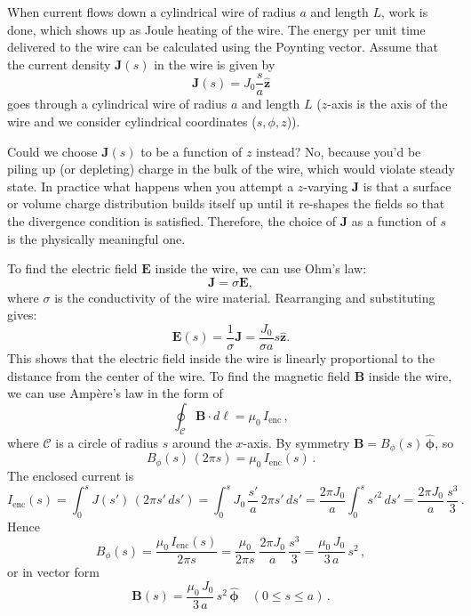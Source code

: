\documentclass[12pt]{article}
\begin{document}
When current flows down a cylindrical wire of radius \(a\) and length \(L\), work is done, which shows up as Joule heating of the wire. The energy per unit time delivered to the wire can be calculated using the Poynting vector. Assume that the current density \(\mathbf{J}(s)\) in the wire is given by
\begin{equation*}
\mathbf{J}(s) = J_0 \frac{s}{a}\hat{\mathbf{z}}
\end{equation*}
\noindent
goes through a cylindrical wire of radius \(a\) and length \(L\) (\(z\)-axis is the axis of the wire and we consider cylindrical coordinates ($s,\phi,z$)). 

\begin{tcolorbox}[colback=yellow!20!white, colframe=blue!75!black, title=Hold on a second!]
Could we choose \(\mathbf{J}(s)\) to be a function of \(z\) instead? No, because you’d be piling up (or depleting) charge in the bulk of the wire, which would violate steady state. In practice what happens when you attempt a \(z\)-varying \(\mathbf{J}\) is that a surface or volume charge distribution builds itself up until it re-shapes the fields so that the divergence condition is satisfied. Therefore, the choice of \(\mathbf{J}\) as a function of \(s\) is the physically meaningful one.
\end{tcolorbox}
\noindent
To find the electric field \(\mathbf{E}\) inside the wire, we can use Ohm's law:
\[
\mathbf{J} = \sigma \mathbf{E},
\]
where \(\sigma\) is the conductivity of the wire material. Rearranging and substituting gives:
\[
\mathbf{E}(s) = \frac{1}{\sigma} \mathbf{J} = \frac{J_0}{\sigma a} s \hat{\mathbf{z}}.
\]
\noindent
This shows that the electric field inside the wire is linearly proportional to the distance from the center of the wire. To find the magnetic field \(\mathbf{B}\) inside the wire, we can use Ampère's law in the form of
\[
\oint_{\mathcal C}\mathbf{B}\cdot d\boldsymbol{\ell}
=\mu_{0}\,I_{\mathrm{enc}}\,,
\]
where \(\mathcal C\) is a circle of radius \(s\) around the \(x\)-axis.  By symmetry \(\mathbf{B}=B_{\phi}(s)\,\hat{\boldsymbol\phi}\), so
\[
B_{\phi}(s)\,(2\pi s)
=\mu_{0}\,I_{\mathrm{enc}}(s)\,.
\]
The enclosed current is
\[
I_{\mathrm{enc}}(s)
=\int_{0}^{s}J(s')\,(2\pi s'\,ds')
=\int_{0}^{s}J_{0}\,\frac{s'}{a}\,2\pi s'\,ds'
=\frac{2\pi J_{0}}{a}\int_{0}^{s}s'^{2}\,ds'
=\frac{2\pi J_{0}}{a}\,\frac{s^{3}}{3}\,.
\]
Hence
\[
B_{\phi}(s)
=\frac{\mu_{0}\,I_{\mathrm{enc}}(s)}{2\pi s}
=\frac{\mu_{0}}{2\pi s}
\;\frac{2\pi J_{0}}{a}\,\frac{s^{3}}{3}
=\frac{\mu_{0}\,J_{0}}{3\,a}\,s^{2}\,,
\]
or in vector form
\[
\mathbf{B}(s)
=\frac{\mu_{0}\,J_{0}}{3\,a}\,s^{2}\,\hat{\boldsymbol\phi}
\quad (0\le s\le a)\,.
\]
\end{document}
